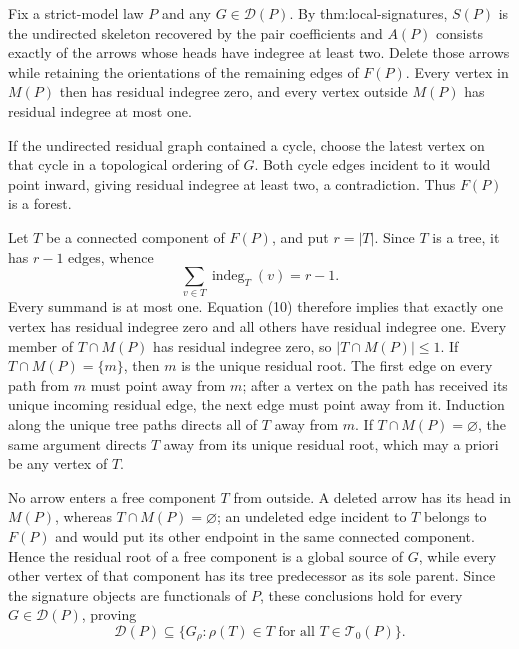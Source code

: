 Fix a strict-model law \(P\) and any \(G\in\mathcal D(P)\).  By thm:local-signatures, \(S(P)\) is the undirected skeleton recovered by the pair coefficients and \(A(P)\) consists exactly of the arrows whose heads have indegree at least two.  Delete those arrows while retaining the orientations of the remaining edges of \(F(P)\).  Every vertex in \(M(P)\) then has residual indegree zero, and every vertex outside \(M(P)\) has residual indegree at most one.

If the undirected residual graph contained a cycle, choose the latest vertex on that cycle in a topological ordering of \(G\).  Both cycle edges incident to it would point inward, giving residual indegree at least two, a contradiction.  Thus \(F(P)\) is a forest.

Let \(T\) be a connected component of \(F(P)\), and put \(r=|T|\).  Since \(T\) is a tree, it has \(r-1\) edges, whence
\[
 \sum_{v\in T}\operatorname{indeg}_T(v)=r-1.
\tag{10}
\]
Every summand is at most one.  Equation (10) therefore implies that exactly one vertex has residual indegree zero and all others have residual indegree one.  Every member of \(T\cap M(P)\) has residual indegree zero, so \(|T\cap M(P)|\le1\).  If \(T\cap M(P)=\{m\}\), then \(m\) is the unique residual root.  The first edge on every path from \(m\) must point away from \(m\); after a vertex on the path has received its unique incoming residual edge, the next edge must point away from it.  Induction along the unique tree paths directs all of \(T\) away from \(m\).  If \(T\cap M(P)=\varnothing\), the same argument directs \(T\) away from its unique residual root, which may a priori be any vertex of \(T\).

No arrow enters a free component \(T\) from outside.  A deleted arrow has its head in \(M(P)\), whereas \(T\cap M(P)=\varnothing\); an undeleted edge incident to \(T\) belongs to \(F(P)\) and would put its other endpoint in the same connected component.  Hence the residual root of a free component is a global source of \(G\), while every other vertex of that component has its tree predecessor as its sole parent.  Since the signature objects are functionals of \(P\), these conclusions hold for every \(G\in\mathcal D(P)\), proving
\[
 \mathcal D(P)\subseteq
 \{G_\rho:\rho(T)\in T\text{ for all }T\in\mathcal T_0(P)\}.
\tag{11}
\]

